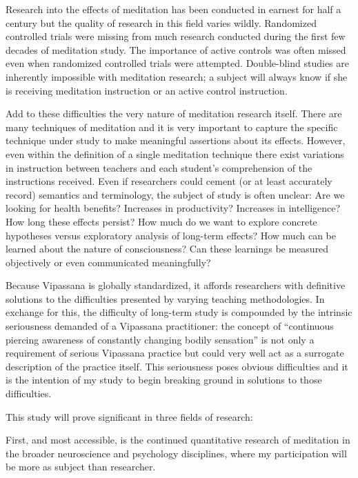 \documentclass[a4paper, amsfonts, amssymb, amsmath, reprint, showkeys, nofootinbib, twoside]{revtex4-1}
\begin{document}
Research into the effects of meditation has been conducted in earnest for half a
century but the quality of research in this field varies wildly. Randomized
controlled trials were missing from much research conducted during the first few
decades of meditation study. The importance of active controls was often missed even
when randomized controlled trials were attempted. Double-blind studies are inherently
impossible with meditation research; a subject will always know if she is receiving
meditation instruction or an active control instruction. \cite{goleman2017altered}

Add to these difficulties the very nature of meditation research itself. There are
many techniques of meditation and it is very important to capture the specific
technique under study to make meaningful assertions about its
effects. \cite{goleman2017altered} However, even within the definition of a single
meditation technique there exist variations in instruction between
teachers and each student's comprehension of the instructions
received. \cite{davidson2015conceptual} Even if researchers could cement (or at least
accurately record) semantics and terminology, the subject of study is often unclear:
Are we looking for health benefits? Increases in productivity? Increases in
intelligence? How long these effects persist? How much do we want to explore concrete
hypotheses versus exploratory analysis of long-term effects? How much can be learned
about the nature of consciousness? Can these learnings be measured objectively or
even communicated meaningfully?

Because Vipassana is globally standardized, it affords researchers with definitive
solutions to the difficulties presented by varying teaching methodologies. In
exchange for this, the difficulty of long-term study is compounded by the intrinsic
seriousness demanded of a Vipassana practitioner: the concept of ``continuous
piercing awareness of constantly changing bodily sensation'' is not only a
requirement of serious Vipassana practice but could very well act as a surrogate
description of the practice itself. This seriousness poses obvious difficulties and
it is the intention of my study to begin breaking ground in solutions to those
difficulties.

This study will prove significant in three fields of research:

First, and most accessible, is the continued quantitative research of meditation in
the broader neuroscience and psychology disciplines, where my participation will be
more as subject than researcher.
\end{document}
